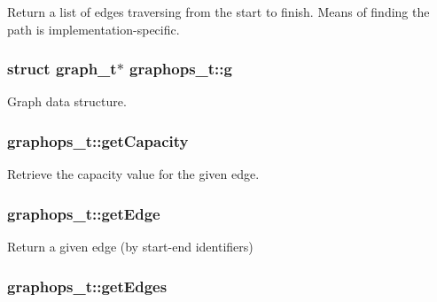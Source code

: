 Return a list of edges traversing from the start to finish. Means of finding the path is implementation-\/specific. 

\subsubsection[{\texorpdfstring{g}{g}}]{\setlength{\rightskip}{0pt plus 5cm}struct {\bf graph\+\_\+t}$\ast$ graphops\+\_\+t\+::g}\hypertarget{structgraphops__t_ac78af00da8d2616ef3499a9632309316}{}\label{structgraphops__t_ac78af00da8d2616ef3499a9632309316}


Graph data structure. 

\subsubsection[{\texorpdfstring{get\+Capacity}{getCapacity}}]{ graphops\+\_\+t\+::get\+Capacity}\hypertarget{structgraphops__t_a2c16b33828f7304837b679fcf2ead523}{}\label{structgraphops__t_a2c16b33828f7304837b679fcf2ead523}


Retrieve the capacity value for the given edge. 

\subsubsection[{\texorpdfstring{get\+Edge}{getEdge}}]{ graphops\+\_\+t\+::get\+Edge}\hypertarget{structgraphops__t_aafbe3ec7bdce040b86d7748c953cf607}{}\label{structgraphops__t_aafbe3ec7bdce040b86d7748c953cf607}


Return a given edge (by start-\/end identifiers) 

\subsubsection[{\texorpdfstring{get\+Edges}{getEdges}}]{ graphops\+\_\+t\+::get\+Edges}\hypertarget{structgraphops__t_a87fec7e1150c05e54e34ab09fe401eaa}{}\label{structgraphops__t_a87fec7e1150c05e54e34ab09fe401eaa}


